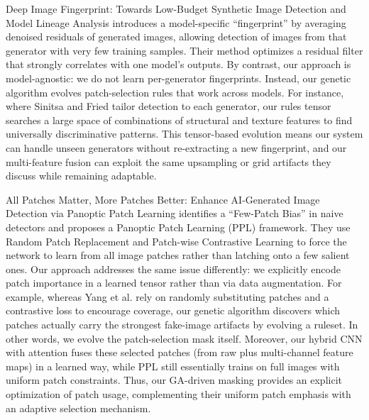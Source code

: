 \documentclass[runningheads]{llncs}
\begin{document}
Deep Image Fingerprint: Towards Low-Budget Synthetic Image Detection and Model Lineage Analysis \cite{sinitsa2024fingerprint} introduces a model-specific ``fingerprint'' by averaging denoised residuals of generated images, allowing detection of images from that generator with very few training samples. Their method optimizes a residual filter that strongly correlates with one model's outputs. By contrast, our approach is model-agnostic: we do not learn per-generator fingerprints. Instead, our genetic algorithm evolves patch-selection rules that work across models. For instance, where Sinitsa and Fried tailor detection to each generator, our rules tensor searches a large space of combinations of structural and texture features to find universally discriminative patterns. This tensor-based evolution means our system can handle unseen generators without re-extracting a new fingerprint, and our multi-feature fusion can exploit the same upsampling or grid artifacts they discuss while remaining adaptable.

All Patches Matter, More Patches Better: Enhance AI-Generated Image Detection via Panoptic Patch Learning \cite{yang2025panoptic} identifies a ``Few-Patch Bias'' in naive detectors and proposes a Panoptic Patch Learning (PPL) framework. They use Random Patch Replacement and Patch-wise Contrastive Learning to force the network to learn from all image patches rather than latching onto a few salient ones. Our approach addresses the same issue differently: we explicitly encode patch importance in a learned tensor rather than via data augmentation. For example, whereas Yang et al. rely on randomly substituting patches and a contrastive loss to encourage coverage, our genetic algorithm discovers which patches actually carry the strongest fake-image artifacts by evolving a ruleset. In other words, we evolve the patch-selection mask itself. Moreover, our hybrid CNN with attention fuses these selected patches (from raw plus multi-channel feature maps) in a learned way, while PPL still essentially trains on full images with uniform patch constraints. Thus, our GA-driven masking provides an explicit optimization of patch usage, complementing their uniform patch emphasis with an adaptive selection mechanism.
\end{document}
